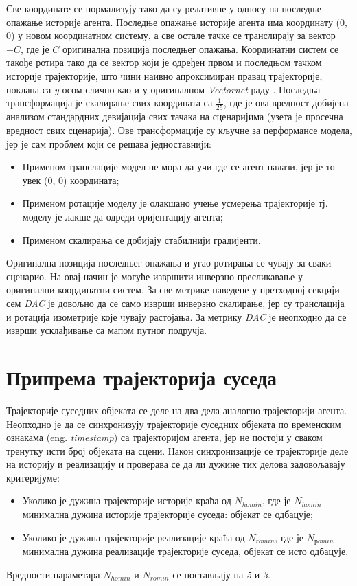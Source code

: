 \documentclass[11pt,oneside]{memoir}
\begin{document}
Све координате се нормализују тако да су релативне у односу на последње опажање историје агента. Последње опажање историје
агента има координату (0, 0) у новом координатном систему, а све остале тачке се транслирају за вектор $-C$, где је $C$ оригинална позиција
последњег опажања. Координатни систем се такође ротира тако да се вектор који је одређен првом и последњом тачком историје трајекторије,
што чини наивно апроксимиран правац трајекторије, поклапа са \textit{y}-осом слично као и у оригиналном \textit{Vectornet} раду \cite{vectornet}. Последња
трансформација је скалирање свих координата са $\frac{1}{25}$, где је ова вредност добијена анализом стандардних девијација свих тачака
на сценаријима (узета је просечна вредност свих сценарија). Ове трансформације су кључне за перформансе модела, јер је сам проблем који се решава
једноставнији:
\begin{itemize}
  \item Применом транслације модел не мора да учи где се агент налази, јер је то увек (0, 0) координата;
  \item Применом ротације моделу је олакшано учење усмерења трајекторије тј. моделу је лакше да одреди оријентацију агента;
  \item Применом скалирања се добијају стабилнији градијенти.
\end{itemize}
Оригинална позиција последњег опажања и угао ротирања се чувају за сваки сценарио. На овај начин је могуће извршити
инверзно пресликавање у оригинални координатни систем. За све метрике наведене у претходној секцији сем \textit{DAC} је довољно
да се само изврши инверзно скалирање, јер су транслација и ротација изометрије које чувају растојања. За метрику \textit{DAC} је 
неопходно да се изврши усклађивање са мапом путног подручја.

\section{Припрема трајекторија суседа}

Трајекторије суседних објеката се деле на два дела аналогно трајекторији агента. Неопходно је да се синхронизују трајекторије 
суседних објеката по временским ознакама (eng. \textit{timestamp}) са трајекторијом агента, јер не постоји у сваком тренутку исти
број објеката на сцени. Након синхронизације се трајекторије деле на историју и реализацију и проверава се да ли дужине тих
делова задовољавају критеријуме:
\begin{itemize}
  \item Уколико је дужина трајекторије историје краћа од $N_{homin}$, где је $N_{homin}$ минимална дужина историје трајекторије суседа: 
        објекат се одбацује;
  \item Уколико је дужина трајекторије реализације краћа од $N_{romin}$, где је $N_{рomin}$ минимална дужина реализације трајекторије суседа, објекат се исто одбацује.
\end{itemize}
Вредности параметара $N_{homin}$ и $N_{romin}$ се постављају на \textit{5} и \textit{3}.
\end{document}
